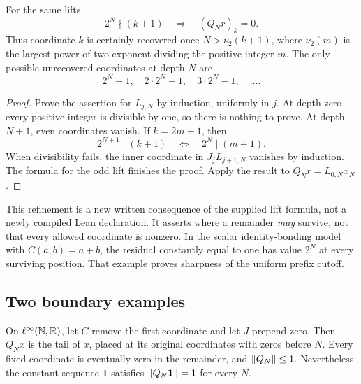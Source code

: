 \begin{proposition}\label{KS55}
For the same lifts,
\[
 2^N\nmid(k+1)\quad\Longrightarrow\quad(Q_Nr)_k=0.
\]
Thus coordinate \(k\) is certainly recovered once \(N>\nu_2(k+1)\), where \(\nu_2(m)\) is the largest power-of-two exponent dividing the positive integer \(m\). The only possible unrecovered coordinates at depth \(N\) are
\[
 2^N-1,\quad 2\cdot2^N-1,\quad3\cdot2^N-1,\quad\ldots.
\]
\end{proposition}
\begin{proof}
Prove the assertion for \(L_{j,N}\) by induction, uniformly in \(j\). At depth zero every positive integer is divisible by one, so there is nothing to prove. At depth \(N+1\), even coordinates vanish. If \(k=2m+1\), then
\[
 2^{N+1}\mid(k+1)\quad\Longleftrightarrow\quad2^N\mid(m+1).
\]
When divisibility fails, the inner coordinate in \(J_jL_{j+1,N}\) vanishes by induction. The formula for the odd lift finishes the proof. Apply the result to \(Q_Nr=L_{0,N}x_N\).
\end{proof}
This refinement is a new written consequence of the supplied lift formula, not a newly compiled Lean declaration. It asserts where a remainder \emph{may} survive, not that every allowed coordinate is nonzero. In the scalar identity-bonding model with \(C(a,b)=a+b\), the residual constantly equal to one has value \(2^N\) at every surviving position. That example proves sharpness of the uniform prefix cutoff.


\subsection{Two boundary examples}
On \(\ell^\infty(\mathbb N,\mathbb R)\), let \(C\) remove the first coordinate and let \(J\) prepend zero. Then \(Q_Nx\) is the tail of \(x\), placed at its original coordinates with zeros before \(N\). Every fixed coordinate is eventually zero in the remainder, and \(\left\lVert Q_N\right\rVert\le1\). Nevertheless the constant sequence \(\mathbf1\) satisfies \(\left\lVert Q_N\mathbf1\right\rVert=1\) for every \(N\).

